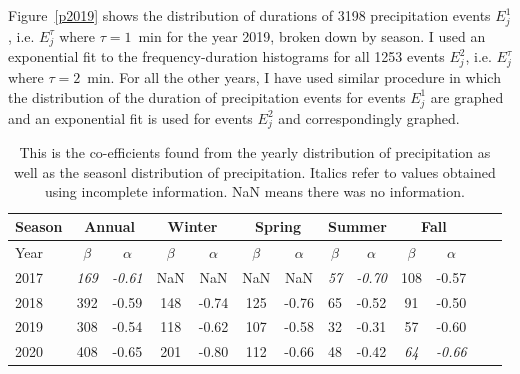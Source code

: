 \documentclass[11pt]{report}
\begin{document}
Figure~\ref{p2019} shows the distribution of durations of 3198
precipitation events $E_j^1$, i.e. $E_j^\tau$ where $\tau=1$~min for
the year 2019, broken down by season. I used an exponential fit to
the frequency-duration histograms for all 1253 events $E_j^2$,
i.e. $E_j^\tau$ where $\tau=2$~min. For all the other years, I have 
used similar procedure in which the distribution of the duration of 
precipitation events for events $E_j^1$ are graphed and an exponential 
fit is used for events $E_j^2$ and correspondingly graphed. 

\begin{table}[b]
	\begin{center}
		\begin{tabular}{|l|*{11}{c|}r|}
			\hline
			Season    &       \multicolumn{2}{|c|}{Annual}          & \multicolumn{2}{|c|}{Winter}& \multicolumn{2}{|c|}{Spring}  & \multicolumn{2}{|c|}{Summer} &\multicolumn{2}{|c|}{Fall}  \\
			\hline
			Year      & $\beta $ & $\alpha$  & $\beta $ & $\alpha$ & $\beta $ & $\alpha$ & $\beta $ & $\alpha$ & $\beta $ & $\alpha$\\
			\hline
			2017      & \textit{169}  & \textit{-0.61}  & NaN & NaN & NaN & NaN & \textit{57}  & \textit{-0.70}  & 108  & -0.57  \\
			2018      & 392           & -0.59  & 148 & -0.74 & 125 & -0.76 & 65  & -0.52  & 91 & -0.50  \\
			2019      & 308           & -0.54  & 118  & -0.62 & 107 & -0.58 & 32 & -0.31  & 57 &  -0.60 \\
			2020      & 408           & -0.65   & 201  & -0.80 & 112  & -0.66 & 48  & -0.42 & \textit{64} & \textit{-0.66}\\
			\hline
		\end{tabular}
	\end{center}
	\caption[Year comparison of coefficients]{This is the co-efficients found from the yearly distribution of precipitation as well as the seasonl distribution of precipitation. Italics refer to values obtained using incomplete information. NaN means there was no information. }
\end{table}
 
\end{document}
